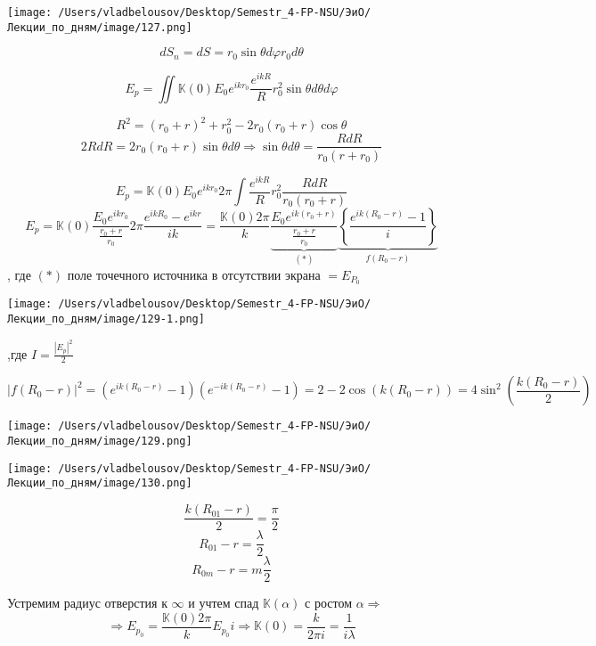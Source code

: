 \documentclass[12pt, a4paper]{report}
\begin{document}
\begin{center}
    \texttt{[image: /Users/vladbelousov/Desktop/Semestr\_4-FP-NSU/ЭиО/Лекции\_по\_дням/image/127.png]}
\end{center}

\[ d S_n = d S = r_0 \sin  \theta d \varphi r_0 d \theta \] 

\[ E_p = \iint \mathbb{K}(0 ) E_0 e^{ i k r_0} \frac{e^{i k R } } {R } r_0 ^2 \sin  \theta d \theta d \varphi     \] 

\[ R ^2 = (r_0 +r   ) ^2 + r_0 ^2 - 2 r_0 (r_0 + r  ) \cos  \theta\] 
\[ 2 R d R = 2 r_0 (r_0 + r ) \sin  \theta d \theta \Rightarrow \sin  \theta d \theta = \frac{ R d R }{r_0 (r + r_0)}  \] 

\[ E_p = \mathbb{K} (0 ) E_0 e^{i k r_0} 2 \pi \int \frac{ e^{i k R } }{R } r_0 ^2 \frac{ R dR }{r_0 (r_0 +r)}    \] 
\[ E_p = \mathbb{K} (0 ) \frac{ E_0 e^{ i k r_0 } }{\displaystyle \frac{r_0 + r }{r_0} }  2 \pi \frac{ e^{i k R_0 } - e^{ i k r} }{i k  } = \frac{\mathbb{K} (0 )2 \pi }{k }\underbrace{ \frac{ E_0 e^{ i k (r_0 +r )} }{\displaystyle  \frac{r_0 +r }{r_0} }}_{(*)} \underbrace{\left\{  \frac{e^{ i k (R_0 -r )} -1 }{i} \right\} }_{f(R_0 -r)}  \] 
, где \( (*) \) поле точечного источника в отсутствии экрана \( = E_{P_0}  \) 

\begin{center}
    \texttt{[image: /Users/vladbelousov/Desktop/Semestr\_4-FP-NSU/ЭиО/Лекции\_по\_дням/image/129-1.png]}
\end{center}
,где \( \displaystyle  I = \frac{|E_p| ^2 }{2}  \) 

\[ |f(R_0 - r)| ^2  = (e ^{ i k (R_0 - r)} -1)(e^{ - ik (R_0 - r)} - 1)= 2 -2 \cos (k(R_0 - r)) = 4 \sin ^2 \left( \frac{k (R_0 -r)}{2}  \right)\] 

\begin{center}
    \texttt{[image: /Users/vladbelousov/Desktop/Semestr\_4-FP-NSU/ЭиО/Лекции\_по\_дням/image/129.png]}
\end{center}

\begin{center}
    \texttt{[image: /Users/vladbelousov/Desktop/Semestr\_4-FP-NSU/ЭиО/Лекции\_по\_дням/image/130.png]}
\end{center}

\[ \frac{k (R_{01} - r)}{2} = \frac{\pi}{2 }   \] 
\[ R_{01} -r = \frac{\lambda}{2 }  \] 
\[ R_{0m} - r = m \frac{\lambda}{2}   \] 

Устремим радиус  отверстия к \( \infty  \) и учтем спад \( \mathbb{K} (\alpha) \) с ростом \( \alpha  \Rightarrow\) 
\[ \Rightarrow E_{p_0} = \frac{\mathbb{K} (0 ) 2 \pi }{k } E_{p_ 0} i \Rightarrow \mathbb{K}(0 ) = \frac{k}{2 \pi i } = \frac{1}{i \lambda }      \] 
\end{document}
